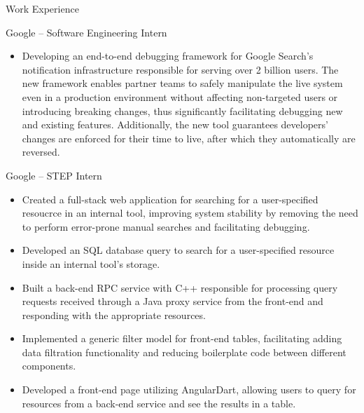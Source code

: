 \documentclass[]{article}
\newlength{\tabin}
\newlength{\secsep}
\newcommand{\lineunder}{\vspace*{-8pt} \\ \hspace*{-6pt} \hrulefill \\ \vspace*{-15pt}}
\newenvironment{tabbedsection}[1]{
  \begin{list}{}{
      \setlength{\itemsep}{0pt}
      \setlength{\labelsep}{0pt}
      \setlength{\labelwidth}{0pt}
      \setlength{\leftmargin}{\tabin}
      \setlength{\rightmargin}{\tabin}
      \setlength{\listparindent}{0pt}
      \setlength{\parsep}{0pt}
      \setlength{\parskip}{0pt}
      \setlength{\partopsep}{0pt}
      \setlength{\topsep}{#1}
    }
  \item[]
}{\end{list}}
\newenvironment{resume_section}[1]{
  \filbreak
  \vspace{2\secsep}
  \textsc{\large#1}
  \lineunder
  \begin{tabbedsection}{\secsep}
}{\end{tabbedsection}}
\newenvironment{resume_subsection}[2][]{
  \textbf{#2} \hfill {\footnotesize #1} \hspace{2em}
  \begin{tabbedsection}{0.5\secsep}
}{\end{tabbedsection}}
\newenvironment{subitems}{
  \renewcommand{\labelitemi}{-}
  \begin{itemize}
      \setlength{\labelsep}{1em}
}{\end{itemize}}
\begin{document}
\begin{resume_section}{Work Experience}

	\begin{resume_subsection}{Google -- Software Engineering Intern}

		\begin{subitems}

			\item Developing an end-to-end debugging framework for Google Search's notification
			infrastructure responsible for serving over 2 billion users. The new framework enables
			partner teams to safely manipulate the live system even in a production environment
			without affecting non-targeted users or introducing breaking changes, thus significantly
			facilitating debugging new and existing features. Additionally, the new tool
			guarantees developers' changes are enforced for their time to live, after which
			they automatically are reversed.


		\end{subitems}

	\end{resume_subsection}

	\begin{resume_subsection}[Irvine, CA (2022.05 -- 2022.08)]{Google -- STEP Intern}

		\begin{subitems}

			\item Created a full-stack web application for searching for a user-specified resoucrce
			in an internal tool, improving system stability by removing the need to perform
			error-prone manual searches and facilitating debugging.

			\item Developed an SQL database query to search for a user-specified resource inside
			an internal tool's storage.

			\item Built a back-end RPC service with C++ responsible for processing query requests
			received through a Java proxy service from the front-end and responding with the
			appropriate resources.

			\item Implemented a generic filter model for front-end tables, facilitating adding
			data filtration functionality and reducing boilerplate code between different components.

			\item Developed a front-end page utilizing AngularDart, allowing users to query for
			resources from a back-end service and see the results in a table.

		\end{subitems}

	\end{resume_subsection}

\end{resume_section}
\end{document}
